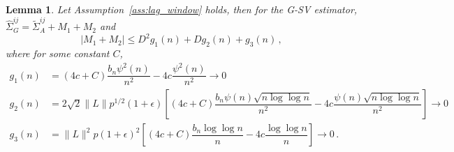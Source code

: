\documentclass[11pt]{article}
\newtheorem{lemma}{Lemma}
\theoremstyle{remark}
\begin{document}
\begin{lemma} \label{lemma:G-SVE_breakdown}
Let Assumption~\ref{ass:lag_window} holds, then for the G-SV estimator, $\hat{\Sigma}_{G}^{ij} = \tilde{\Sigma}_A^{ij} + M_1 + M_2$ and 
\[
|M_1 + M_2| \leq D^2 g_1(n) + D g_2(n) + g_3(n)\,,
\]
where for some constant $C$,
\begin{align*}
    g_1(n) &= (4c+C)\dfrac{b_n \psi^2(n)}{n^2} - 4c\dfrac{\psi^2(n)}{n^2} \to 0\\
    g_2(n) &= 2\sqrt{2}\|L\|p^{1/2}(1+\epsilon)\left[(4c+C)\dfrac{b_n\psi(n)\sqrt{n\log \log n}}{n^2} - 4c\dfrac{\psi(n)\sqrt{n\log \log n}}{n^2}\right] \to 0\\
    g_3(n) &= \|L\|^2 p (1+\epsilon)^2\left[(4c+C)\dfrac{b_n \log\log n}{n} - 4c \dfrac{\log \log n}{n}\right] \to 0\,.
\end{align*}
\end{lemma}
\end{document}
